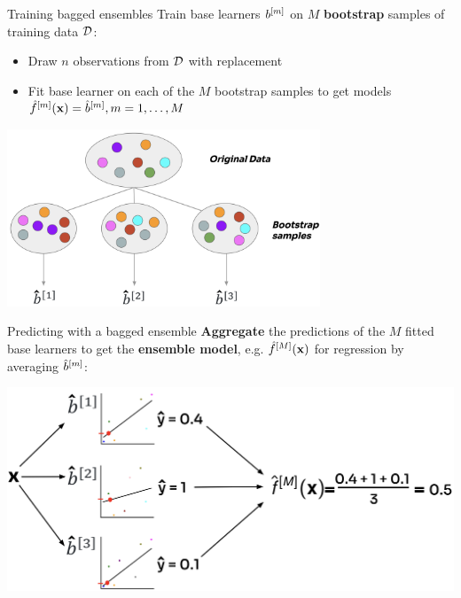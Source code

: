 \documentclass[11pt,compress,t,notes=noshow, xcolor=table]{beamer}
\begin{document}
\begin{vbframe}{Training bagged ensembles}
Train base learners $b^{[m]}$ on $M$ \textbf{bootstrap} samples of training data $\mathcal{D}$:
\begin{itemize}
  \item Draw $n$ observations from $\mathcal{D}$ with replacement
  \item Fit base learner on each of the $M$ bootstrap samples to get models $\hat{f}^{[m]}(\mathbf{x}) = \hat{b}^{[m]}, m = 1, \dots, M$
\end{itemize}

\begin{center}
\includegraphics[width=0.7\textwidth]{figure_man/forest-bagging.png}
\end{center}

\end{vbframe}

\begin{vbframe}{Predicting with a bagged ensemble}
\textbf{Aggregate} the predictions of the $M$ fitted base learners to get the \textbf{ensemble model}, e.g. $\hat f^{[M]}(\mathbf{x})$ for regression by averaging $\hat{b}^{[m]}$:

\begin{center}
\includegraphics[width=1\textwidth]{figure_man/forest-bagg_regr.png}
\end{center}
\end{vbframe}
\end{document}
